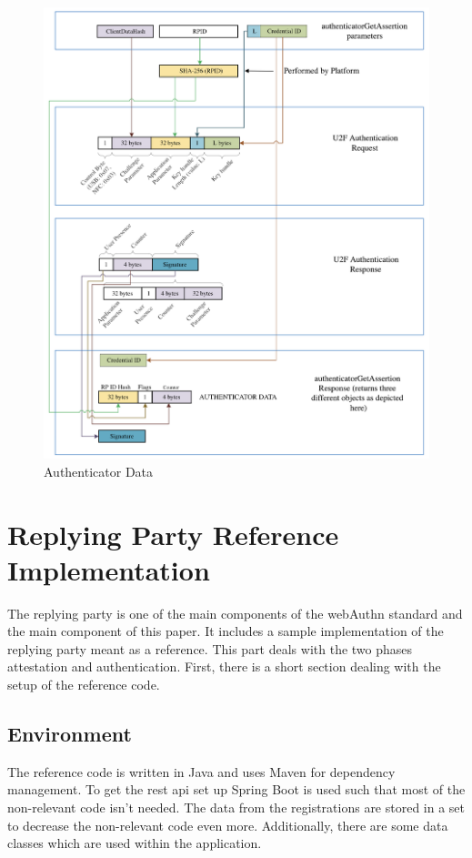 \documentclass[a4paper, 11pt]{scrartcl}
\begin{document}
\begin{figure}[h]
  \includegraphics[width=12cm]{img/u2fcompat-getassertion.png}
  \centering
  \caption{Authenticator Data}
  \label{fig:authenticationMapping}
\end{figure}


\section{Replying Party Reference Implementation}
\label{sec:replying_party}

The replying party is one of the main components of the \gls{webAuthn} standard and the main component of this paper. It includes a sample implementation of the replying party meant as a reference. This part deals with the two phases attestation and authentication. First, there is a short section dealing with the setup of the reference code.

\subsection{Environment}

The reference code is written in Java and uses Maven for dependency management. To get the \gls{rest} \gls{api} set up Spring Boot is used such that most of the non-relevant code isn't needed. The data from the registrations are stored in a set to decrease the non-relevant code even more. Additionally, there are some data classes which are used within the application.
\end{document}
